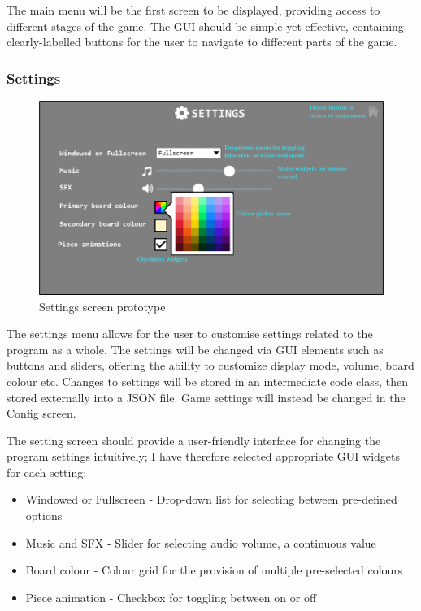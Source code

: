\documentclass[../main/main.tex]{subfiles}
\begin{document}
The main menu will be the first screen to be displayed, providing access to different stages of the game. The GUI should be simple yet effective, containing clearly-labelled buttons for the user to navigate to different parts of the game.

\subsubsection{Settings}
\begin{figure}[ht!]
    \centering
    \includegraphics[width=0.8\columnwidth]{../design/assets/settings_gui.png}
    \caption{Settings screen prototype}
    \label{fig:settings-gui}
\end{figure}

The settings menu allows for the user to customise settings related to the program as a whole. The settings will be changed via GUI elements such as buttons and sliders, offering the ability to customize display mode, volume, board colour etc. Changes to settings will be stored in an intermediate code class, then stored externally into a JSON file. Game settings will instead be changed in the Config screen.

The setting screen should provide a user-friendly interface for changing the program settings intuitively; I have therefore selected appropriate GUI widgets for each setting:

\begin{itemize}
\item Windowed or Fullscreen - Drop-down list for selecting between pre-defined options
\item Music and SFX - Slider for selecting audio volume, a continuous value
\item Board colour - Colour grid for the provision of multiple pre-selected colours
\item Piece animation - Checkbox for toggling between on or off
\end{itemize}
\end{document}
